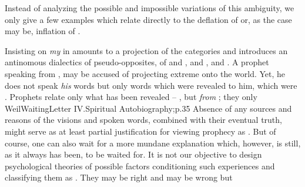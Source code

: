 Instead of analyzing the possible and impossible variations of this ambiguity,
we only give a few examples which relate directly to the deflation of 
or, as the case may be, inflation of .

 Insisting on {\em my} in  amounts to a
projection of the  categories and introduces an antinomous
dialectics of pseudo-opposites, of  and , 
and ,  and .  A prophet speaking
from , may be accused of projecting extreme  onto
the  world.  Yet, he does not speak {\em his} words but only
words which were revealed to him, which were  .
Prophets relate only what has been revealed -- , but {\em from}
; they only \citet{repeat words they have heard in secret amidst
  the silence.}{WeilWaiting}{Letter IV.Spiritual Autobiography;p.35 Absence of any 
  sources and reasons of the visions and spoken words, combined with their
  eventual truth, might serve as at least partial justification for viewing
  prophecy as . But of
  course, one can also wait for a more mundane explanation which, however, is
  still, as it always has been, to be waited for.} It is not our
objective to design psychological theories of possible factors conditioning such
experiences and classifying them as . They may be right and may be wrong but

